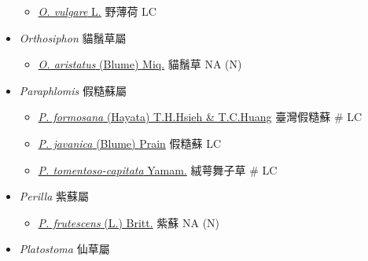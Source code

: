 \begin{itemize}
  \begin{itemize}
        \item[] \href{http://www.theplantlist.org/tpl1.1/search?q=Origanum+vulgare}{\textit{O. vulgare} L.}   野薄荷   LC
  \end{itemize}
 \item[] \textit{Orthosiphon} 貓鬚草屬
                                
  \begin{itemize}
        \item[] \href{http://www.theplantlist.org/tpl1.1/search?q=Orthosiphon+aristatus}{\textit{O. aristatus} (Blume) Miq.}   貓鬚草   NA (N)
  \end{itemize}
 \item[] \textit{Paraphlomis} 假糙蘇屬
                                
  \begin{itemize}
        \item[] \href{http://www.theplantlist.org/tpl1.1/search?q=Paraphlomis+formosana}{\textit{P. formosana} (Hayata) T.H.Hsieh \& T.C.Huang}   臺灣假糙蘇  \# LC
        \item[] \href{http://www.theplantlist.org/tpl1.1/search?q=Paraphlomis+javanica}{\textit{P. javanica} (Blume) Prain}   假糙蘇   LC
        \item[] \href{http://www.theplantlist.org/tpl1.1/search?q=Paraphlomis+tomentoso-capitata}{\textit{P. tomentoso-capitata} Yamam.}   絨萼舞子草  \# LC
  \end{itemize}
 \item[] \textit{Perilla} 紫蘇屬
                                
  \begin{itemize}
        \item[] \href{http://www.theplantlist.org/tpl1.1/search?q=Perilla+frutescens}{\textit{P. frutescens} (L.) Britt.}   紫蘇   NA (N)
  \end{itemize}
 \item[] \textit{Platostoma} 仙草屬
                                

\end{itemize}
